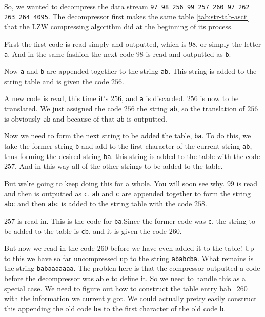 \begin{refsection}
So, we wanted to decompress the data stream \texttt{97 98 256 99 257
  260 97 262 263 264 4095}. The decompressor first makes the same
table \ref{tab:str-tab-ascii}  that the LZW compressing algorithm did at the beginning of
its process.

First the first code is read simply and outputted, which is $98$, or
simply the letter \texttt{a}. And in the same fashion the next code
$98$ is read and outputted as \texttt{b}.

Now \texttt{a} and \texttt{b} are appended together to the string
\texttt{ab}. This string is added to the string table and is given the
code $256$.

A new code is read, this time it's $256$, and \texttt{a} is
discarded. $256$ is now to be translated. We just assigned the code
$256$ the string \texttt{ab}, so the translation of $256$ is obviously
\texttt{ab} and because of that \texttt{ab} is outputted.

Now we need to form the next string to be added the table,
\texttt{ba}. To do this, we take the former string \texttt{b} and add
to the first character of the current string \texttt{ab}, thus forming
the desired string \texttt{ba}. this string is added to the table with
the code $257$. And in this way all of the other strings to be added
to the table.

But we're going to keep doing this for a whole. You will soon see
why. $99$ is read and then is outputted as \texttt{c}. \texttt{ab} and
\texttt{c} are appended together to form the string \texttt{abc} and then
\texttt{abc} is added to the string table with the code $258$.

$257$ is read in. This is the code for \texttt{ba}.Since the former
code was \texttt{c}, the string to be added to the table is
\texttt{cb}, and it is given the code $260$.

But now we read in the code $260$ before we have even added it to the
table! Up to this we have so far uncompressed up to the string
\texttt{ababcba}. What remains is the string \texttt{babaaaaaaa}. The
problen here is that the compressor outputted a code before the
decompressor was able to define it. So we need to handle this as a
special case. We need to figure out how to construct the table entry
bab=260 with the information we currently got. We could actually
pretty easily construct this appending the old code \texttt{ba} to the
first character of the old code \texttt{b}.

\newcommand{\ko}{\ensuremath{k\omega}\xspace}
\newcommand{\kok}{\ensuremath{\ko k}\xspace}
\newcommand{\kokok}{\ensuremath{\kok \omega k}\xspace}


\end{refsection}

